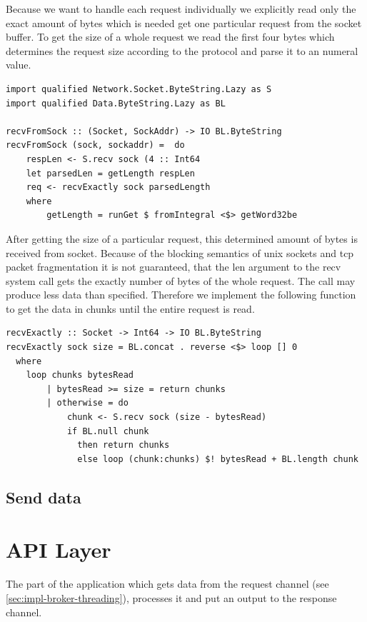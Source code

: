 Because we want to handle each request individually we explicitly read
only the exact amount of bytes which is needed get one particular request from
the socket buffer. To get the size of a whole request we read the first four
bytes which determines the request size according to the protocol and parse it
to an numeral value.

\begin{lstlisting}
import qualified Network.Socket.ByteString.Lazy as S 
import qualified Data.ByteString.Lazy as BL

recvFromSock :: (Socket, SockAddr) -> IO BL.ByteString
recvFromSock (sock, sockaddr) =  do 
    respLen <- S.recv sock (4 :: Int64
    let parsedLen = getLength respLen
    req <- recvExactly sock parsedLength 
    where
        getLength = runGet $ fromIntegral <$> getWord32be
\end{lstlisting}

After getting the size of a particular request, this determined amount of bytes
is received from socket. Because of the blocking semantics of unix sockets and
tcp packet fragmentation it is not guaranteed, that the len argument to the recv
system call gets the exactly number of bytes of the whole request. The call may produce
less data than specified. Therefore we implement the following function to get
the data in
chunks until the entire request is read. 

\begin{lstlisting}
recvExactly :: Socket -> Int64 -> IO BL.ByteString 
recvExactly sock size = BL.concat . reverse <$> loop [] 0 
  where
    loop chunks bytesRead
        | bytesRead >= size = return chunks
        | otherwise = do  
            chunk <- S.recv sock (size - bytesRead)
            if BL.null chunk 
              then return chunks 
              else loop (chunk:chunks) $! bytesRead + BL.length chunk 
\end{lstlisting}

\subsection{Send data}


\section{API Layer}
The part of the application which gets data from the request channel (see
\ref{sec:impl-broker-threading}), processes
it and put an output to the response channel. 

